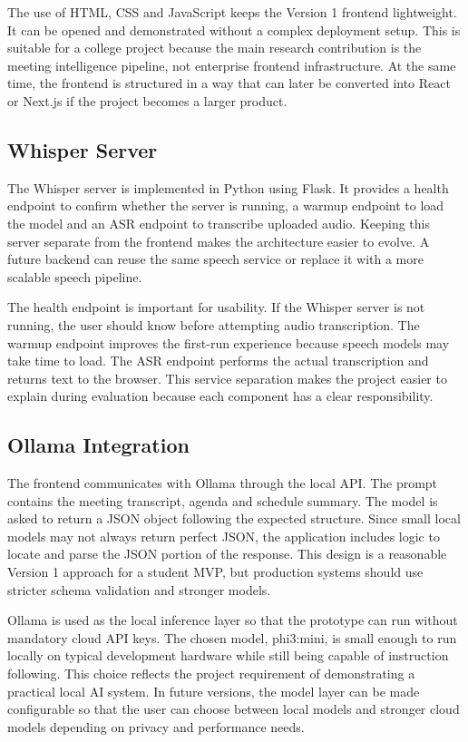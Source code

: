 \documentclass[11pt,a4paper]{article}
\begin{document}
The use of HTML, CSS and JavaScript keeps the Version 1 frontend lightweight. It can be opened and demonstrated without a complex deployment setup. This is suitable for a college project because the main research contribution is the meeting intelligence pipeline, not enterprise frontend infrastructure. At the same time, the frontend is structured in a way that can later be converted into React or Next.js if the project becomes a larger product.

\subsection{Whisper Server}

The Whisper server is implemented in Python using Flask. It provides a health endpoint to confirm whether the server is running, a warmup endpoint to load the model and an ASR endpoint to transcribe uploaded audio. Keeping this server separate from the frontend makes the architecture easier to evolve. A future backend can reuse the same speech service or replace it with a more scalable speech pipeline.

The health endpoint is important for usability. If the Whisper server is not running, the user should know before attempting audio transcription. The warmup endpoint improves the first-run experience because speech models may take time to load. The ASR endpoint performs the actual transcription and returns text to the browser. This service separation makes the project easier to explain during evaluation because each component has a clear responsibility.

\subsection{Ollama Integration}

The frontend communicates with Ollama through the local API. The prompt contains the meeting transcript, agenda and schedule summary. The model is asked to return a JSON object following the expected structure. Since small local models may not always return perfect JSON, the application includes logic to locate and parse the JSON portion of the response. This design is a reasonable Version 1 approach for a student MVP, but production systems should use stricter schema validation and stronger models.

Ollama is used as the local inference layer so that the prototype can run without mandatory cloud API keys. The chosen model, phi3:mini, is small enough to run locally on typical development hardware while still being capable of instruction following. This choice reflects the project requirement of demonstrating a practical local AI system. In future versions, the model layer can be made configurable so that the user can choose between local models and stronger cloud models depending on privacy and performance needs.
\end{document}
